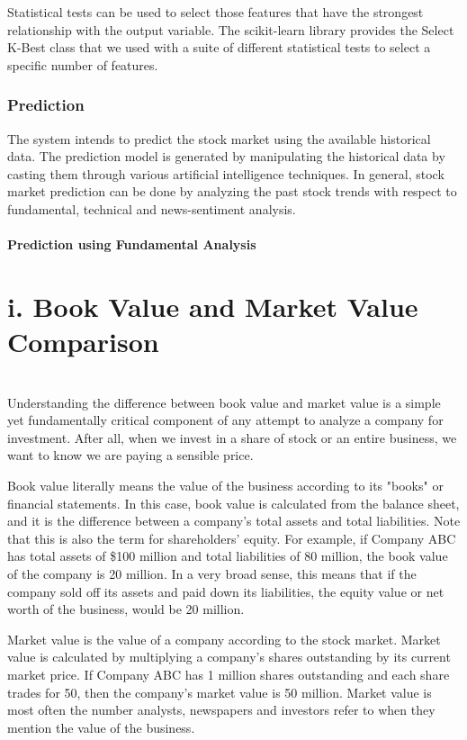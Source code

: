 Statistical tests can be used to select those features that have the strongest relationship with the output variable. The scikit-learn library provides the Select K-Best class that we used with a suite of different statistical tests to select a specific number of features.

\subsection{Prediction}
The system intends to predict the stock market using the available historical data. The prediction model is generated by manipulating the historical data by casting them through various artificial intelligence techniques. In general, stock market prediction can be done by analyzing the past stock trends with respect to fundamental, technical and news-sentiment analysis. 
\subsubsection{Prediction using Fundamental Analysis}
\chapter{\textbf{i. Book Value and Market Value Comparison }}\\
\cite{faa} Understanding the difference between book value and market value is a simple yet fundamentally critical component of any attempt to analyze a company for investment. After all, when we invest in a share of stock or an entire business, we want to know we are paying a sensible price.

	Book value literally means the value of the business according to its "books" or financial statements. In this case, book value is calculated from the balance sheet, and it is the difference between a company's total assets and total liabilities. Note that this is also the term for shareholders' equity. For example, if Company ABC has total assets of \$100 million and total liabilities of 80 million, the book value of the company is 20 million. In a very broad sense, this means that if the company sold off its assets and paid down its liabilities, the equity value or net worth of the business, would be 20 million.
	
	Market value is the value of a company according to the stock market. Market value is calculated by multiplying a company's shares outstanding by its current market price. If Company ABC has 1 million shares outstanding and each share trades for 50, then the company's market value is 50 million. Market value is most often the number analysts, newspapers and investors refer to when they mention the value of the business.
	
